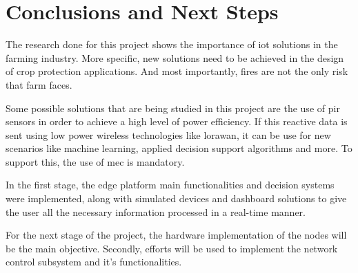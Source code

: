 \section{Conclusions and Next Steps}

The research done for this project shows the importance of \acrshort{iot} solutions in the farming industry. More specific, new solutions need 
to be achieved in the design of crop protection applications. And most importantly, fires are not the only risk that farm faces.

Some possible solutions that are being studied in this project are the use of \acrshort{pir} sensors in order to achieve a high level of 
power efficiency. If this reactive data is sent using low power wireless technologies like \acrshort{lorawan}, it can be use 
for new scenarios like machine learning, applied decision support algorithms and more. To support this, the use of \acrshort{mec} is mandatory.

In the first stage, the edge platform main functionalities and decision systems were implemented, along with simulated devices and dashboard solutions to 
give the user all the necessary information processed in a real-time manner.

For the next stage of the project, the hardware implementation of the nodes will be the main objective. Secondly, efforts will be used to implement the network 
control subsystem and it's functionalities.